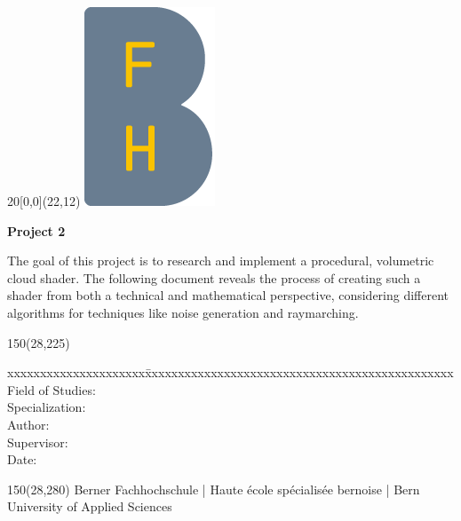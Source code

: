 
\begin{titlepage}

\setlength{\unitlength}{1mm}

\begin{textblock}{20}[0,0](22,12)
    \includegraphics{../img/BFH_Logo_B.png}
\end{textblock}

\begin{flushleft}

\vspace*{21mm}

\fontsize{24.88pt}{40pt}\selectfont
\textbf{\doctitle}
\vspace{2mm}

\fontsize{17.28pt}{24pt}\selectfont\vspace{0.3em}
\docsubtitle
\vspace{5mm}

\fontsize{10pt}{12pt}\selectfont
\textbf{Project 2}

\fontsize{10pt}{12pt}\selectfont
The goal of this project is to research and implement a procedural, volumetric cloud shader. The following document reveals the process of creating such a shader from both a technical and mathematical perspective, considering different algorithms for techniques like noise generation and raymarching.
\begin{textblock}{150}(28,225)
\fontsize{10pt}{17pt}
\begin{tabbing}
xxxxxxxxxxxxxxxxxxxxx\=xxxxxxxxxxxxxxxxxxxxxxxxxxxxxxxxxxxxxxxxxxxxxxx \kill
Field of Studies:	\> \fieldofstudies	\\
Specialization:	    \> \specialisation	\\
Author:		        \> \docauthor \\
Supervisor:         \> \prof \\
Date:			    \> \versiondate \\
\end{tabbing}

\end{textblock}

\begin{textblock}{150}(28,280)
\noindent 
\color{bfhgrey}\fontsize{9pt}{10pt}\selectfont
Berner Fachhochschule | Haute \'ecole sp\'ecialis\'ee bernoise | Bern University of Applied Sciences
\color{black}\selectfont
\end{textblock}

\end{flushleft}

\end{titlepage}

\clearpage
